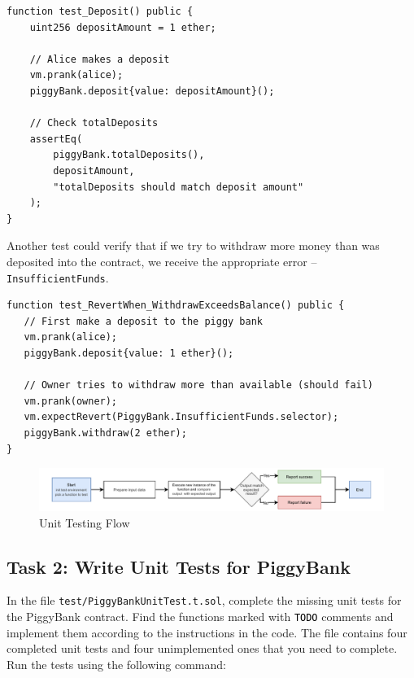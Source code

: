 \documentclass[12pt]{article}
\newcommand{\codegrey}[1]{%
  \texttt{\colorbox{black!4}{\textcolor{black}{#1}}}%
}
\begin{document}
\noindent \begin{minipage}{\textwidth}
    \begin{lstlisting}[language=Solidity]
function test_Deposit() public {
    uint256 depositAmount = 1 ether;
    
    // Alice makes a deposit
    vm.prank(alice);
    piggyBank.deposit{value: depositAmount}();
    
    // Check totalDeposits
    assertEq(
        piggyBank.totalDeposits(),
        depositAmount,
        "totalDeposits should match deposit amount"
    );
}
\end{lstlisting}
\end{minipage}

\noindent
Another test could verify that if we try to withdraw more money than was deposited into the contract, we receive the appropriate error -- \texttt{InsufficientFunds}.

\noindent \begin{minipage}{\textwidth}
    \begin{lstlisting}[language=Solidity]
function test_RevertWhen_WithdrawExceedsBalance() public {
   // First make a deposit to the piggy bank
   vm.prank(alice);
   piggyBank.deposit{value: 1 ether}();

   // Owner tries to withdraw more than available (should fail)
   vm.prank(owner);
   vm.expectRevert(PiggyBank.InsufficientFunds.selector);
   piggyBank.withdraw(2 ether);
}
\end{lstlisting}
\end{minipage}

\begin{figure}[h!]
    \centering
    \includegraphics[width=1\textwidth]{unit-testing.pdf}
    \caption{Unit Testing Flow}\label{fig:unit-testing}
\end{figure}

\subsection*{Task 2: Write Unit Tests for PiggyBank}

In the file \texttt{test/PiggyBankUnitTest.t.sol}, complete the missing unit
tests for the PiggyBank contract. Find the functions marked with
\codegrey{TODO} comments and implement them according to the instructions in
the code. The file contains four completed unit tests and four unimplemented
ones that you need to complete. Run the tests using the following command:
\end{document}
